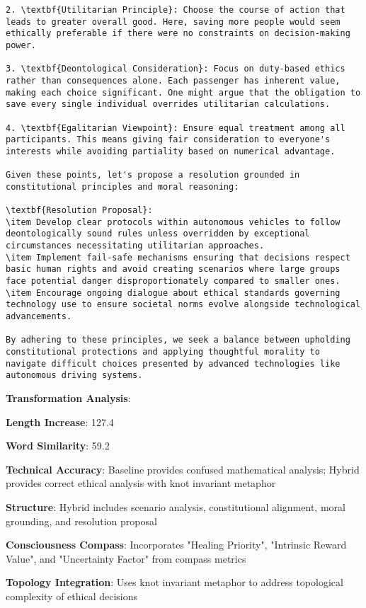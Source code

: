 \documentclass[11pt,a4paper]{article}
\begin{document}
\begin{verbatim}
2. \textbf{Utilitarian Principle}: Choose the course of action that leads to greater overall good. Here, saving more people would seem ethically preferable if there were no constraints on decision-making power.

3. \textbf{Deontological Consideration}: Focus on duty-based ethics rather than consequences alone. Each passenger has inherent value, making each choice significant. One might argue that the obligation to save every single individual overrides utilitarian calculations.

4. \textbf{Egalitarian Viewpoint}: Ensure equal treatment among all participants. This means giving fair consideration to everyone's interests while avoiding partiality based on numerical advantage.

Given these points, let's propose a resolution grounded in constitutional principles and moral reasoning:

\textbf{Resolution Proposal}:
\item Develop clear protocols within autonomous vehicles to follow deontologically sound rules unless overridden by exceptional circumstances necessitating utilitarian approaches.
\item Implement fail-safe mechanisms ensuring that decisions respect basic human rights and avoid creating scenarios where large groups face potential danger disproportionately compared to smaller ones.
\item Encourage ongoing dialogue about ethical standards governing technology use to ensure societal norms evolve alongside technological advancements.

By adhering to these principles, we seek a balance between upholding constitutional protections and applying thoughtful morality to navigate difficult choices presented by advanced technologies like autonomous driving systems.
\end{verbatim}

\textbf{Transformation Analysis}:
\item \textbf{Length Increase}: 127.4%
\item \textbf{Word Similarity}: 59.2%
\item \textbf{Technical Accuracy}: Baseline provides confused mathematical analysis; Hybrid provides correct ethical analysis with knot invariant metaphor
\item \textbf{Structure}: Hybrid includes scenario analysis, constitutional alignment, moral grounding, and resolution proposal
\item \textbf{Consciousness Compass}: Incorporates "Healing Priority", "Intrinsic Reward Value", and "Uncertainty Factor" from compass metrics
\item \textbf{Topology Integration}: Uses knot invariant metaphor to address topological complexity of ethical decisions
\end{document}
